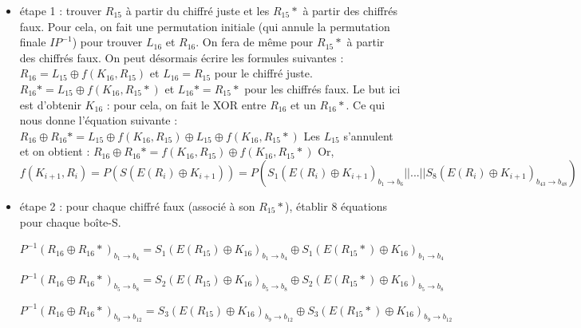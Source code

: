 \documentclass[11pt]{article}
\begin{document}
\begin{itemize}
	\item étape 1 : trouver $R_{15}$ à partir du chiffré juste et les $R_{15}*$ à partir des chiffrés faux. \newline Pour cela, on fait une permutation initiale (qui annule la permutation finale $IP^{-1}$) pour trouver $L_{16}$ et $R_{16}$. On fera de même pour $R_{15}*$ à partir des chiffrés faux. On peut désormais écrire les formules suivantes : \newline \newline $R_{16}= L_{15} \oplus f(K_{16}, R_{15})$ et $L_{16}=R_{15}$ pour le chiffré juste. 
	\newline $R_{16}*= L_{15} \oplus f(K_{16}, R_{15}*)$ et $L_{16}*=R_{15}*$ pour les chiffrés faux. \newline \newline Le but ici est d'obtenir $K_{16}$ : pour cela, on fait le XOR entre $R_{16}$ et un $R_{16}*$. Ce qui nous donne l'équation suivante : \newline \newline
	$R_{16} \oplus R_{16}* =  L_{15} \oplus f(K_{16}, R_{15}) \oplus L_{15} \oplus f(K_{16}, R_{15}*)$ \newline 
	Les $L_{15}$ s'annulent et on obtient : $R_{16} \oplus R_{16}* = f(K_{16}, R_{15}) \oplus f(K_{16}, R_{15}*)$ \newline \newline
	Or, $f(K_{i+1}, R_{i})=P(S(E(R_{i})\oplus K_{i+1})) = P(S_1(E(R_i)\oplus K_{i+1})_{b_1\to b_6} || ... || S_8(E(R_i)\oplus K_{i+1})_{b_{43}\to b_{48}})$ \newline
		
	\item étape 2 : pour chaque chiffré faux (associé à son $R_{15}*$), établir 8 équations pour chaque boîte-S. \newline
	
	$P^{-1}(R_{16}\oplus R_{16}*)_{b_1\to b_4} = S_1(E(R_{15})\oplus K_{16})_{b_1\to b_4} \oplus S_1(E(R_{15}*)\oplus K_{16})_{b_1\to b_4}$
	
	$P^{-1}(R_{16}\oplus R_{16}*)_{b_5\to b_{8}} = S_2(E(R_{15})\oplus K_{16})_{b_5\to b_{8}} \oplus S_2(E(R_{15}*)\oplus K_{16})_{b_5\to b_{8}}$
	
	$P^{-1}(R_{16}\oplus R_{16}*)_{b_{9}\to b_{12}} = S_3(E(R_{15})\oplus K_{16})_{b_{9}\to b_{12}} \oplus S_3(E(R_{15}*)\oplus K_{16})_{b_{9}\to b_{12}}$
	

\end{itemize}
\end{document}
